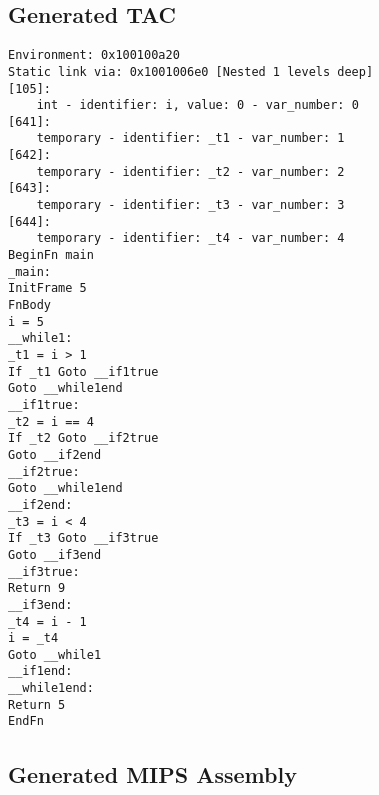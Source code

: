 \subsection{Generated TAC}
\begin{verbatim}
Environment: 0x100100a20
Static link via: 0x1001006e0 [Nested 1 levels deep]
[105]:
	int - identifier: i, value: 0 - var_number: 0
[641]:
	temporary - identifier: _t1 - var_number: 1
[642]:
	temporary - identifier: _t2 - var_number: 2
[643]:
	temporary - identifier: _t3 - var_number: 3
[644]:
	temporary - identifier: _t4 - var_number: 4
BeginFn main
_main:
InitFrame 5
FnBody
i = 5
__while1:
_t1 = i > 1
If _t1 Goto __if1true
Goto __while1end
__if1true:
_t2 = i == 4
If _t2 Goto __if2true
Goto __if2end
__if2true:
Goto __while1end
__if2end:
_t3 = i < 4
If _t3 Goto __if3true
Goto __if3end
__if3true:
Return 9
__if3end:
_t4 = i - 1
i = _t4
Goto __while1
__if1end:
__while1end:
Return 5
EndFn
\end{verbatim}\subsection{Generated MIPS Assembly}

